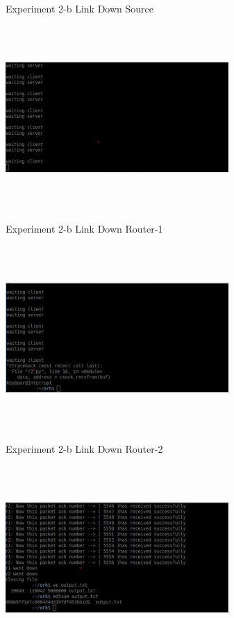 \documentclass[letterpaper, 12 pt, conference]{ieeeconf}  %
\begin{document}
\begin{center}
Experiment 2-b Link Down Source
\end{center}


\includegraphics[width=8.5cm, height=7cm]{Experiment 2-b-r1.png}

\begin{center}
Experiment 2-b Link Down Router-1
\end{center}


\includegraphics[width=8.5cm, height=7cm]{Experiment 2-b-r2.png}

\begin{center}
Experiment 2-b Link Down Router-2
\end{center}

\includegraphics[width=8.5cm, height=7cm]{Experiment 2-b-dest.png}
\end{document}
